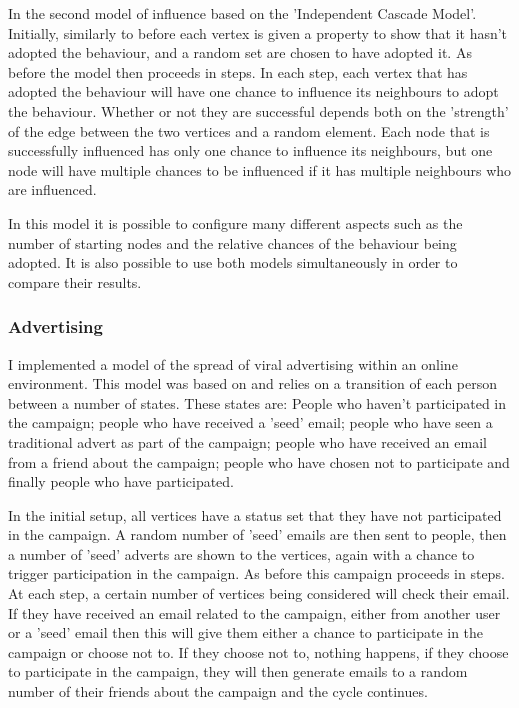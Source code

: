 \documentclass[12pt,a4paper]{article}
\begin{document}
In the second model of influence based on the 'Independent Cascade Model'. Initially, similarly to before each vertex is given a property to show that it hasn't adopted the behaviour, and a random set are chosen to have adopted it. As before the model then proceeds in steps. In each step, each vertex that has adopted the behaviour will have one chance to influence its neighbours to adopt the behaviour. Whether or not they are successful depends both on the 'strength' of the edge between the two vertices and a random element. Each node that is successfully influenced has only one chance to influence its neighbours, but one node will have multiple chances to be influenced if it has multiple neighbours who are influenced.

In this model it is possible to configure many different aspects such as the number of starting nodes and the relative chances of the behaviour being adopted. It is also possible to use both models simultaneously in order to compare their results.

\subsubsection{Advertising}

I implemented a model of the spread of viral advertising within an online environment. This model was based on \cite{van2010viral} and relies on a transition of each person between a number of states. These states are: People who haven't participated in the campaign; people who have received a 'seed' email; people who have seen a traditional advert as part of the campaign;  people who have received an email from a friend about the campaign; people who have chosen not to participate and finally people who have participated.

In the initial setup, all vertices have a status set that they have not participated in the campaign. A random number of 'seed' emails are then sent to people, then a number of 'seed' adverts are shown to the vertices, again with a chance to trigger participation in the campaign. As before this campaign proceeds in steps. At each step, a certain number of vertices being considered will check their email. If they have received an email related to the campaign, either from another user or a 'seed' email then this will give them either a chance to participate in the campaign or choose not to. If they choose not to, nothing happens, if they choose to participate in the campaign, they will then generate emails to a random number of their friends about the campaign and the cycle continues.
\end{document}
